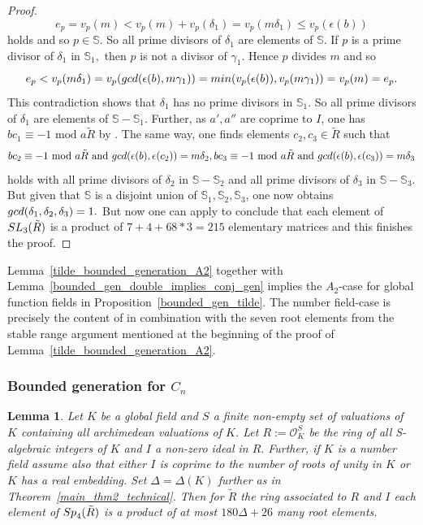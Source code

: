 \documentclass[12pt]{amsart}
\newtheorem{lemma}[theorem]{Lemma}
\theoremstyle{definition}\newtheorem{definition}[theorem]{Definition}
\theoremstyle{remark}\newtheorem{remark}[theorem]{Remark}
\theoremstyle{definition}\newtheorem{case}{Case}
\begin{document}
\begin{proof}
$$
e_p=v_p(m)<v_p(m)+v_p(\delta_1)=v_p(m\delta_1)\leq v_p(\epsilon(b))
$$
holds and so $p\in \mathbb{S}.$ So all prime divisors of $\delta_1$ are elements of $\mathbb{S}.$ If $p$ is a prime divisor of $\delta_1$ in $\mathbb{S}_1,$ then $p$ is not a divisor of $\gamma_1$. Hence $p$ divides $m$ and so
$$
e_p<v_p(m\delta_1)=v_p({\rm gcd}(\epsilon(b),m\gamma_1))={\rm min}(v_p(\epsilon(b)),v_p(m\gamma_1))=v_p(m)=e_p.
$$
This contradiction shows that $\delta_1$ has no prime divisors in $\mathbb{S}_1.$ So all prime divisors of $\delta_1$ are elements of $\mathbb{S}-\mathbb{S}_1.$ Further, as $a',a''$ are coprime to $I$, one has $bc_1\equiv -1\text{ mod }a\tilde{R}$ by \cite[Lemma~2.1]{gvozdevsky2023width}. The same way, one finds elements $c_2,c_3\in\tilde{R}$ such that 
$$
bc_2\equiv -1\text{ mod }a\tilde{R}\text{ and }{\rm gcd}(\epsilon(b),\epsilon(c_2))=m\delta_2,bc_3\equiv -1\text{ mod }a\tilde{R}\text{ and }{\rm gcd}(\epsilon(b),\epsilon(c_3))=m\delta_3
$$
holds with all prime divisors of $\delta_2$ in $\mathbb{S}-\mathbb{S}_2$ and all prime divisors of $\delta_3$ in $\mathbb{S}-\mathbb{S}_3$.
But given that $\mathbb{S}$ is a disjoint union of $\mathbb{S}_1,\mathbb{S}_2,\mathbb{S}_3$, one now obtains ${\rm gcd}(\delta_1,\delta_2,\delta_3)=1.$ But now one can apply \cite[Proposition~4.1]{gvozdevsky2023width} to conclude that each element of ${\rm SL}_3(\tilde{R})$ is a product of $7+4+68*3=215$ elementary matrices and this finishes the proof.
\end{proof}

Lemma~\ref{tilde_bounded_generation_A2} together with Lemma~\ref{bounded_gen_double_implies_conj_gen} implies the $A_2$-case for global function fields in Proposition~\ref{bounded_gen_tilde}. The number field-case is precisely the content of \cite[Theorem~3.1]{gvozdevsky2023width} in combination with the seven root elements from the stable range argument mentioned at the beginning of the proof of Lemma~\ref{tilde_bounded_generation_A2}.

\subsubsection{Bounded generation for $C_n$}

\begin{lemma}\label{tilde_bounded_generation_C2}
Let $K$ be a global field and $S$ a finite non-empty set of valuations of $K$ containing all archimedean valuations of $K$. Let $R:=\mathscr{O}_K^S$ be the ring of all S-algebraic integers of $K$ and $I$ a non-zero ideal in $R.$ Further, if $K$ is a number field assume also that either $I$ is coprime to the number of roots of unity in $K$ or $K$ has a real embedding. Set $\Delta=\Delta(K)$ further as in Theorem~\ref{main_thm2_technical}. Then for $\tilde{R}$ the ring associated to $R$ and $I$ each element of ${\rm Sp}_4(\tilde{R})$ is a product of at most $180\Delta+26$ many root elements.
\end{lemma}
\end{document}

